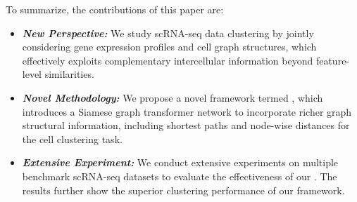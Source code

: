 To summarize, the contributions of this paper are:
\begin{itemize}[leftmargin=*] 

\item[\circlefir{}]  
\textbf{\textit{New Perspective:}} We study scRNA-seq data clustering by jointly considering gene expression profiles and cell graph structures, which effectively exploits complementary intercellular information beyond feature-level similarities. 

\item[\circlesec{}]  \textbf{\textit{Novel Methodology:}} We propose a novel framework termed \method{}, which introduces a Siamese graph transformer network to incorporate richer graph structural information, including shortest paths and node-wise distances for the cell clustering task.

\item[\circlethi{}] \textbf{\textit{Extensive Experiment:}} We conduct extensive experiments on multiple benchmark scRNA-seq datasets to evaluate the effectiveness of our \method{}. The results further show the superior clustering performance of our framework.
\end{itemize} 










